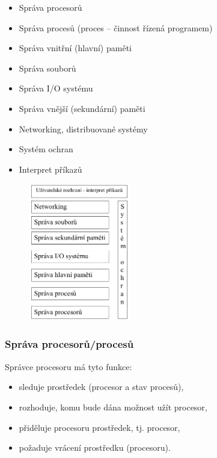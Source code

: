 \begin{itemize}
	\item Správa procesorů
	\item Správa procesů (proces – činnost řízená programem)
	\item Správa vnitřní (hlavní) paměti
	\item Správa souborů 
	\item Správa I/O systému
	\item Správa vnější (sekundární) paměti 
	\item Networking, distribuované systémy
	\item Systém ochran
	\item Interpret příkazů
\end{itemize}
\begin{figure}[H]
\centering
\includegraphics[width=0.4\textwidth]{assets/3_gen_komp_os}
\end{figure}

\subsubsection{Správa procesorů/procesů}
Správce procesoru má tyto funkce:
\begin{itemize}
	\item sleduje prostředek (procesor a stav procesů),
	\item rozhoduje, komu bude dána možnost užít procesor,
	\item přiděluje procesoru prostředek, tj. procesor,
	\item požaduje vrácení prostředku (procesoru).
\end{itemize}

